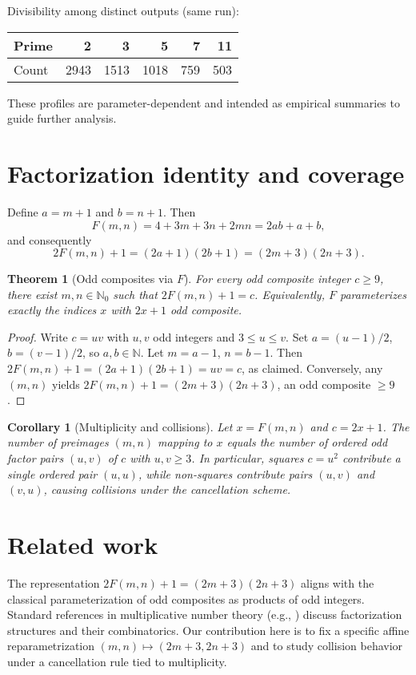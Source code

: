 \documentclass[12pt,a4paper]{article}
\newtheorem{theorem}{Theorem}[section]
\newtheorem{corollary}{Corollary}[section]
\begin{document}
Divisibility among distinct outputs (same run):
\begin{center}
\begin{tabular}{l|rrrrr}
Prime & 2 & 3 & 5 & 7 & 11 \\
\hline
Count & 2943 & 1513 & 1018 & 759 & 503 \\
\end{tabular}
\end{center}

These profiles are parameter-dependent and intended as empirical summaries to guide further analysis.

\section{Factorization identity and coverage}
Define \(a=m+1\) and \(b=n+1\). Then
\[
F(m,n) = 4 + 3m + 3n + 2mn = 2ab + a + b,
\]
and consequently
\[
2F(m,n) + 1 = (2a+1)(2b+1) = (2m+3)(2n+3).
\]

\begin{theorem}[Odd composites via \(F\)]\label{thm:coverage}
For every odd composite integer \(c\ge 9\), there exist \(m,n\in\mathbb{N}_0\) such that \(2F(m,n) + 1 = c\). Equivalently, \(F\) parameterizes exactly the indices \(x\) with \(2x+1\) odd composite.
\end{theorem}
\begin{proof}
Write \(c=uv\) with \(u,v\) odd integers and \(3\le u\le v\). Set \(a=(u-1)/2\), \(b=(v-1)/2\), so \(a,b\in\mathbb{N}\). Let \(m=a-1\), \(n=b-1\). Then
\(2F(m,n) + 1 = (2a+1)(2b+1) = uv = c\), as claimed. Conversely, any \((m,n)\) yields \(2F(m,n)+1=(2m+3)(2n+3)\), an odd composite \(\ge 9\).
\end{proof}

\begin{corollary}[Multiplicity and collisions]\label{cor:mult}
Let \(x=F(m,n)\) and \(c=2x+1\). The number of preimages \((m,n)\) mapping to \(x\) equals the number of ordered odd factor pairs \((u,v)\) of \(c\) with \(u,v\ge 3\). In particular, squares \(c=u^2\) contribute a single ordered pair \((u,u)\), while non-squares contribute pairs \((u,v)\) and \((v,u)\), causing collisions under the cancellation scheme.
\end{corollary}

\section{Related work}
The representation \(2F(m,n)+1=(2m+3)(2n+3)\) aligns with the classical parameterization of odd composites as products of odd integers. Standard references in multiplicative number theory (e.g., \cite{hardywright2008, montgomery2007}) discuss factorization structures and their combinatorics. Our contribution here is to fix a specific affine reparametrization \((m,n)\mapsto (2m+3,2n+3)\) and to study collision behavior under a cancellation rule tied to multiplicity.
\end{document}
